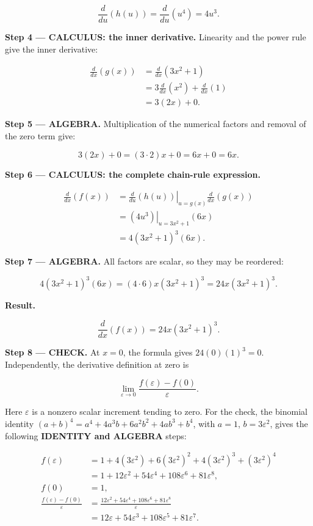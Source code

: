 \documentclass[11pt,oneside,openany]{book}
\begin{document}
\[
\frac{d}{du}\left(h(u)\right)
=\frac{d}{du}\left(u^4\right)
=4u^3.
\]

\textbf{Step 4 --- CALCULUS: the inner derivative.} Linearity and the power rule give the inner derivative:

\[
\begin{aligned}
\frac{d}{dx}\left(g(x)\right)
&=\frac{d}{dx}\left(3x^2+1\right)\\
&=3\frac{d}{dx}\left(x^2\right)+\frac{d}{dx}\left(1\right)\\
&=3(2x)+0.
\end{aligned}
\]

\begingroup\color{AlgebraBlue}
\textbf{Step 5 --- ALGEBRA.} Multiplication of the numerical factors and removal of the zero term give:

\[
3(2x)+0=(3\cdot2)x+0=6x+0=6x.
\]

\endgroup
\textbf{Step 6 --- CALCULUS: the complete chain-rule expression.}

\[
\begin{aligned}
\frac{d}{dx}\left(f(x)\right)
&=\left.\frac{d}{du}\left(h(u)\right)\right|_{u=g(x)}
\frac{d}{dx}\left(g(x)\right)\\
&=\left.\left(4u^3\right)\right|_{u=3x^2+1}(6x)\\
&=4(3x^2+1)^3(6x).
\end{aligned}
\]

\begingroup\color{AlgebraBlue}
\textbf{Step 7 --- ALGEBRA.} All factors are scalar, so they may be reordered:

\[
4(3x^2+1)^3(6x)=(4\cdot6)x(3x^2+1)^3=24x(3x^2+1)^3.
\]

\endgroup
\textbf{Result.}

\[
\boxed{\frac{d}{dx}\left(f(x)\right)=24x(3x^2+1)^3.}
\]

\textbf{Step 8 --- CHECK.} At \(x=0\), the formula gives \(24(0)(1)^3=0\). Independently, the derivative definition at zero is

\[
\lim_{\varepsilon\to0}\frac{f(\varepsilon)-f(0)}{\varepsilon}.
\]

Here \(\varepsilon\) is a nonzero scalar increment tending to zero. For the check, the binomial identity
\((a+b)^4=a^4+4a^3b+6a^2b^2+4ab^3+b^4\), with \(a=1\), \(b=3\varepsilon^2\), gives the following \textbf{IDENTITY and ALGEBRA} steps:

\[
\begin{aligned}
f(\varepsilon)&=1+4(3\varepsilon^2)+6(3\varepsilon^2)^2+4(3\varepsilon^2)^3+(3\varepsilon^2)^4\\
&=1+12\varepsilon^2+54\varepsilon^4+108\varepsilon^6+81\varepsilon^8,\\
f(0)&=1,\\
\frac{f(\varepsilon)-f(0)}{\varepsilon}
&=\frac{12\varepsilon^2+54\varepsilon^4+108\varepsilon^6+81\varepsilon^8}{\varepsilon}\\
&=12\varepsilon+54\varepsilon^3+108\varepsilon^5+81\varepsilon^7.
\end{aligned}
\]
\end{document}
